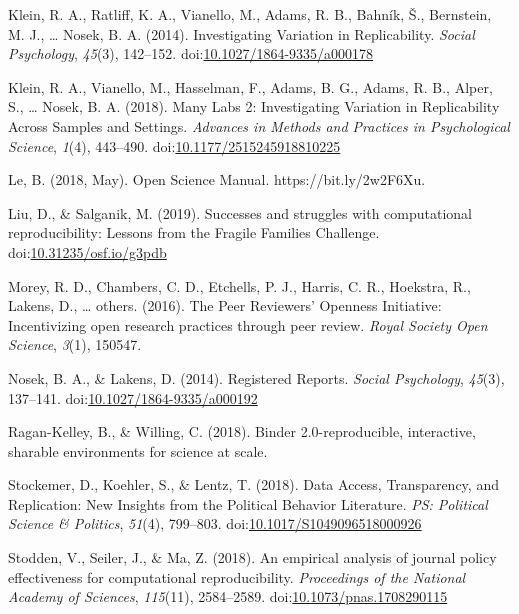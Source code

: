 \documentclass[
  ,jou, a4paper,floatsintext]{apa6}
\begin{document}
\leavevmode\hypertarget{ref-klein_investigating_2014}{}%
Klein, R. A., Ratliff, K. A., Vianello, M., Adams, R. B., Bahník, Š., Bernstein, M. J., \ldots{} Nosek, B. A. (2014). Investigating Variation in Replicability. \emph{Social Psychology}, \emph{45}(3), 142--152. doi:\href{https://doi.org/10.1027/1864-9335/a000178}{10.1027/1864-9335/a000178}

\leavevmode\hypertarget{ref-klein_many_2018}{}%
Klein, R. A., Vianello, M., Hasselman, F., Adams, B. G., Adams, R. B., Alper, S., \ldots{} Nosek, B. A. (2018). Many Labs 2: Investigating Variation in Replicability Across Samples and Settings. \emph{Advances in Methods and Practices in Psychological Science}, \emph{1}(4), 443--490. doi:\href{https://doi.org/10.1177/2515245918810225}{10.1177/2515245918810225}

\leavevmode\hypertarget{ref-le_open_2018}{}%
Le, B. (2018, May). Open Science Manual. https://bit.ly/2w2F6Xu.

\leavevmode\hypertarget{ref-liu_successes_2019}{}%
Liu, D., \& Salganik, M. (2019). Successes and struggles with computational reproducibility: Lessons from the Fragile Families Challenge. doi:\href{https://doi.org/10.31235/osf.io/g3pdb}{10.31235/osf.io/g3pdb}

\leavevmode\hypertarget{ref-morey_peer_2016}{}%
Morey, R. D., Chambers, C. D., Etchells, P. J., Harris, C. R., Hoekstra, R., Lakens, D., \ldots{} others. (2016). The Peer Reviewers' Openness Initiative: Incentivizing open research practices through peer review. \emph{Royal Society Open Science}, \emph{3}(1), 150547.

\leavevmode\hypertarget{ref-nosek_registered_2014}{}%
Nosek, B. A., \& Lakens, D. (2014). Registered Reports. \emph{Social Psychology}, \emph{45}(3), 137--141. doi:\href{https://doi.org/10.1027/1864-9335/a000192}{10.1027/1864-9335/a000192}

\leavevmode\hypertarget{ref-ragan2018binder}{}%
Ragan-Kelley, B., \& Willing, C. (2018). Binder 2.0-reproducible, interactive, sharable environments for science at scale.

\leavevmode\hypertarget{ref-stockemer_data_2018}{}%
Stockemer, D., Koehler, S., \& Lentz, T. (2018). Data Access, Transparency, and Replication: New Insights from the Political Behavior Literature. \emph{PS: Political Science \& Politics}, \emph{51}(4), 799--803. doi:\href{https://doi.org/10.1017/S1049096518000926}{10.1017/S1049096518000926}

\leavevmode\hypertarget{ref-stodden_empirical_2018}{}%
Stodden, V., Seiler, J., \& Ma, Z. (2018). An empirical analysis of journal policy effectiveness for computational reproducibility. \emph{Proceedings of the National Academy of Sciences}, \emph{115}(11), 2584--2589. doi:\href{https://doi.org/10.1073/pnas.1708290115}{10.1073/pnas.1708290115}
\end{document}
